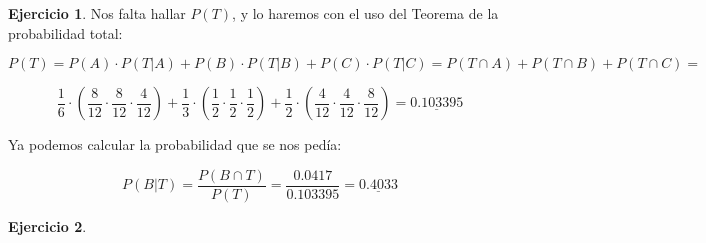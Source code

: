 \documentclass[a4paper, 12pt]{article}
\theoremstyle{definition}
\newtheorem{ej}{Ejercicio}
\begin{document}
\begin{ej}
Nos falta hallar $P(T)$, y lo haremos con el uso del Teorema de la probabilidad total:

\begin{center}
    $P(T) = P(A) \cdot P(T|A) + P(B) \cdot P(T|B) + P(C) \cdot P(T|C) = P(T \cap A) + P(T \cap B) + P(T \cap C) = $
\end{center}

\[
    \frac{1}{6}\cdot \left(\frac{8}{12} \cdot \dfrac{8}{12} \cdot \frac{4}{12} \right) + \frac{1}{3} \cdot \left(\frac{1}{2} \cdot \dfrac{1}{2} \cdot \frac{1}{2} \right) + \frac{1}{2} \cdot \left(\frac{4}{12} \cdot \dfrac{4}{12} \cdot \frac{8}{12} \right) = \underline{0.103395}
\]

Ya podemos calcular la probabilidad que se nos pedía:

\[
    P(B|T) = \frac{P(B \cap T)}{P(T)} = \frac{0.0417}{0.103395} = \underline{0.4033}
\]
\end{ej}

\begin{ej}
\end{ej}
\end{document}
